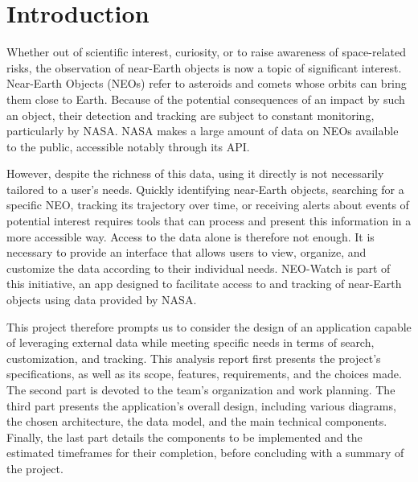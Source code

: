 \section{Introduction}
Whether out of scientific interest, curiosity, or to raise awareness of space-related risks, the observation of near-Earth objects is now a topic of significant interest. Near-Earth Objects (NEOs) refer to asteroids and comets whose orbits can bring them close to Earth. Because of the potential consequences of an impact by such an object, their detection and tracking are subject to constant monitoring, particularly by NASA. NASA makes a large amount of data on NEOs available to the public, accessible notably through its API.

\vspace{0.25cm}

However, despite the richness of this data, using it directly is not necessarily tailored to a user’s needs. Quickly identifying near-Earth objects, searching for a specific NEO, tracking its trajectory over time, or receiving alerts about events of potential interest requires tools that can process and present this information in a more accessible way. Access to the data alone is therefore not enough. It is necessary to provide an interface that allows users to view, organize, and customize the data according to their individual needs.
NEO-Watch is part of this initiative, an app designed to facilitate access to and tracking of near-Earth objects using data provided by NASA.

\vspace{0.25cm}

This project therefore prompts us to consider the design of an application capable of leveraging external data while meeting specific needs in terms of search, customization, and tracking. This analysis report first presents the project’s specifications, as well as its scope, features, requirements, and the choices made. The second part is devoted to the team’s organization and work planning. The third part presents the application’s overall design, including various diagrams, the chosen architecture, the data model, and the main technical components. Finally, the last part details the components to be implemented and the estimated timeframes for their completion, before concluding with a summary of the project.
